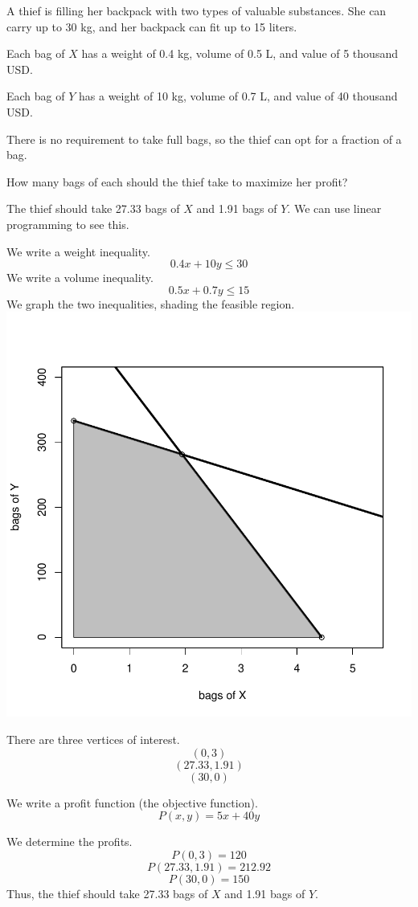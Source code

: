 
\begin{question}
A thief is filling her backpack with two types of valuable substances.
She can carry up to 30 kg, and her backpack can fit up to 15 liters.

Each bag of \(X\) has a weight of 0.4 kg, volume of 0.5 L, and value of
5 thousand USD.

Each bag of \(Y\) has a weight of 10 kg, volume of 0.7 L, and value of
40 thousand USD.

There is no requirement to take full bags, so the thief can opt for a
fraction of a bag.

How many bags of each should the thief take to maximize her profit?
\end{question}

\begin{solution}
The thief should take 27.33 bags of \(X\) and 1.91 bags of \(Y\). We can
use linear programming to see this.

We write a weight inequality. \[0.4x+10y \le 30\] We write a volume
inequality. \[0.5x+0.7y \le 15\] We graph the two inequalities, shading
the feasible region. \includegraphics{unnamed-chunk-1-1.pdf}

There are three vertices of interest. \[(0,3) \] \[(27.33,1.91) \]
\[(30,0)\]

We write a profit function (the objective function).
\[P(x,y) = 5x+40y \]

We determine the profits. \[P(0,3)=120 \] \[P(27.33,1.91)=212.92 \]
\[P(30,0)=150 \] Thus, the thief should take 27.33 bags of \(X\) and
1.91 bags of \(Y\).
\end{solution}

